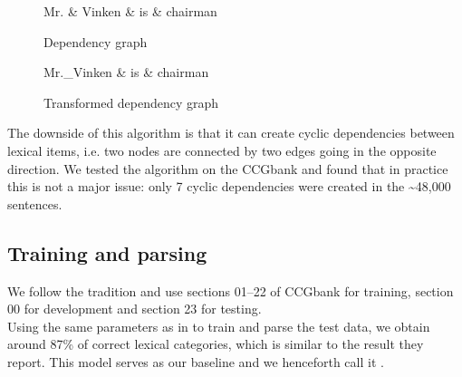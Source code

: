\documentclass[output=paper]{langsci/langscibook}
\begin{document}
    \begin{multicols}{2}
        \begin{figure}[H]
            \begin{dependency}
                \begin{deptext}[column sep=1em]
                    Mr. \& Vinken \& is \& chairman \\
                \end{deptext}
            \end{dependency}
            \caption{Dependency graph\label{del:dep4}}
        \end{figure}
        \columnbreak
        \begin{figure}[H]
            \begin{dependency}
                \begin{deptext}[column sep=1em]
                    Mr.\_Vinken \& is \& chairman \\
                \end{deptext}
            \end{dependency}
            \caption{Transformed dependency graph\label{del:dep3}}
        \end{figure}
    \end{multicols}

    \indent The downside of this algorithm is that it can create cyclic dependencies between lexical items, i.e. two nodes are connected by two edges going in the opposite direction. We tested the algorithm on the CCGbank and found that in practice this is not a major issue: only 7 cyclic dependencies were created in the \textasciitilde 48,000 sentences.

    \subsection{Training and parsing}
    \label{del:trainparse}
    \indent We follow the tradition and use sections 01--22 of CCGbank for training, section 00 for development and section 23 for testing.\\
    \indent Using the same parameters as in \citet{deoskar} to train and parse the test data, we obtain around 87\% of correct lexical categories, which is similar to the result they report. This model serves as our baseline and we henceforth call it {\modelA}.
    
\end{document}
